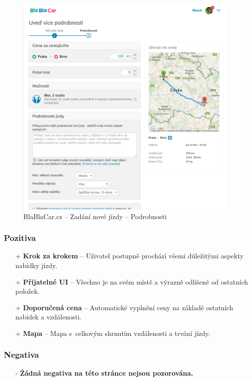 \begin{figure}[h]
    \centering
    \includegraphics[width=1.0\textwidth]{media/blablacar/offer2.png}
    \caption{BlaBlaCar.cz -- Zadání nové jízdy -- Podrobnosti}
    \label{fig:blablacar:offer2}
\end{figure}
\subsubsection*{Pozitiva}
\begin{itemize}
    \item[+] \textbf{Krok za krokem} -- Uživatel postupně prochází všemi důležitými aspekty nabídky jízdy.
    \item[+] \textbf{Přijatelné UI} -- Všechno je na svém místě a výrazně odlišené od ostatních položek.
    \item[+] \textbf{Doporučená cena} -- Automatické vyplnění ceny na základě ostatních nabídek a vzdálenosti.
    \item[+] \textbf{Mapa} -- Mapa s~celkovým shrnutím vzdálenosti a trvání jízdy.
\end{itemize}
\subsubsection*{Negativa}
\begin{itemize}
    \item[-] \textbf{Žádná negativa na této stránce nejsou pozorována.}
\end{itemize}


